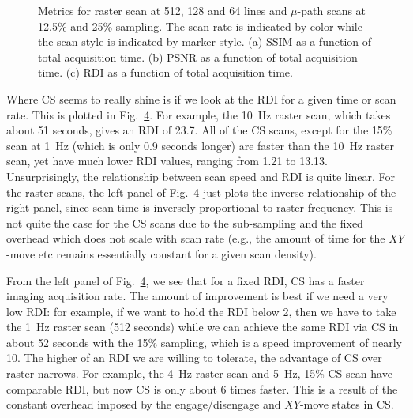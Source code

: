 \documentclass[twocolumn,oneside]{IEEEtran/IEEEtran}
\begin{document}
\begin{figure}[t!]
  \centering
  \begin{subfigure}{0.329\linewidth}
    \centering
    
    \caption{}
    \label{fig:time_ssim}
  \end{subfigure}
  \begin{subfigure}{0.329\linewidth}
    \centering
    
    \caption{}
    \label{fig:time_psnr}
  \end{subfigure}
  \begin{subfigure}{0.329\linewidth}
    \centering
    
    \caption{}
    \label{fig:time_damage}
  \end{subfigure}
  \caption{Metrics for raster scan at 512, 128 and 64 lines and
    $\mu$-path scans at 12.5\% and 25\% sampling. The scan rate is
    indicated by color while the scan style is indicated by marker
    style. (a) SSIM as a function of total acquisition time. (b) PSNR
    as a function of total acquisition time. (c) RDI as a function of
    total acquisition time.}
\end{figure}

Where CS seems to really shine is if we look at the RDI for a given
time or scan rate. This is plotted in Fig.~\ref{fig:time_damage}. For
example, the 10~Hz raster scan, which takes about 51 seconds, gives an
RDI of 23.7. All of the CS scans, except for the 15\% scan at 1~Hz
(which is only 0.9 seconds longer) are faster than the 10~Hz raster
scan, yet have much lower RDI values, ranging from 1.21 to 13.13.
Unsurprisingly, the relationship between scan speed and RDI is quite
linear. For the raster scans, the left panel of
Fig.~\ref{fig:time_damage} just plots the inverse relationship of the
right panel, since scan time is inversely proportional to raster
frequency. This is not quite the case for the CS scans due to the
sub-sampling and the fixed overhead which does not scale with scan
rate (e.g., the amount of time for the $XY$-move etc remains
essentially constant for a given scan density).

From the left panel of Fig.~\ref{fig:time_damage}, we see that for a
fixed RDI, CS has a faster imaging acquisition rate. The amount of
improvement is best if we need a very low RDI: for example, if we want
to hold the RDI below 2, then we have to take the 1~Hz raster scan
(512 seconds) while we can achieve the same RDI via CS in about 52
seconds with the 15\% sampling, which is a speed improvement of nearly
10. The higher of an RDI we are willing to tolerate, the advantage of
CS over raster narrows. For example, the 4~Hz raster scan and 5~Hz,
15\% CS scan have comparable RDI, but now CS is only about 6 times
faster. This is a result of the constant overhead imposed by the
engage/disengage and $XY$-move states in CS.
\end{document}
